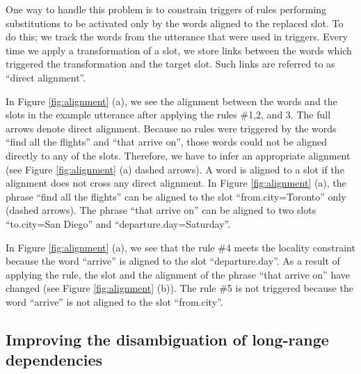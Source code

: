 \documentclass{article}
\begin{document}
One way to handle this problem is to constrain triggers of rules performing substitutions to be activated only by the words aligned to the replaced slot. To do this; we track the words from the utterance that were used in triggers. Every time we apply a transformation of a slot, we store links between the words which triggered the transformation and the target slot. Such links are referred to as ``direct alignment''. 


In Figure \ref{fig:alignment} (a), we see the alignment between the words and the slots in the example utterance after applying the rules \#1,2, and 3. The full arrows denote direct alignment. Because no rules were triggered by the words ``find all the flights'' and ``that arrive on'', those words could not be aligned directly to any of the slots. Therefore, we have to infer an appropriate alignment (see Figure \ref{fig:alignment} (a) dashed arrows). A word is aligned to a slot if the alignment does not cross any direct alignment.
In Figure \ref{fig:alignment} (a), the phrase ``find all the flights'' can be aligned to the slot ``from.city=Toronto'' only (dashed arrows). The phrase ``that arrive on'' can be aligned to two slots ``to.city=San Diego'' and ``departure.day=Saturday''. 

In Figure \ref{fig:alignment} (a), we see that the rule \#4 meets the locality constraint because the word ``arrive'' is aligned to the slot ``departure.day''. As a result of applying the rule, the slot and the alignment of the phrase ``that arrive on'' have changed (see Figure \ref{fig:alignment} (b)). 
The rule \#5 is not triggered because the word ``arrive'' is not aligned to the slot ``from.city''.

\subsection{Improving the disambiguation of long-range dependencies}
\label{sec:dep:trees}
\end{document}
